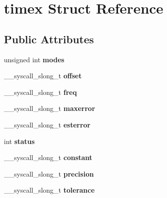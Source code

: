 \hypertarget{structtimex}{\section{timex Struct Reference}
\label{structtimex}
}
\subsection*{Public Attributes}
\begin{DoxyCompactItemize}
\item 
\hypertarget{structtimex_ab8e9ae426d0cf972b8133f1c8af5d7a7}{unsigned int {\bfseries modes}}\label{structtimex_ab8e9ae426d0cf972b8133f1c8af5d7a7}

\item 
\hypertarget{structtimex_a16a573a2edfa22f45ce7055a299abadd}{\+\_\+\+\_\+syscall\+\_\+slong\+\_\+t {\bfseries offset}}\label{structtimex_a16a573a2edfa22f45ce7055a299abadd}

\item 
\hypertarget{structtimex_a804c651db264aff521444997c08943c5}{\+\_\+\+\_\+syscall\+\_\+slong\+\_\+t {\bfseries freq}}\label{structtimex_a804c651db264aff521444997c08943c5}

\item 
\hypertarget{structtimex_a6cb2b8d652aabf89fdd92c28b841a112}{\+\_\+\+\_\+syscall\+\_\+slong\+\_\+t {\bfseries maxerror}}\label{structtimex_a6cb2b8d652aabf89fdd92c28b841a112}

\item 
\hypertarget{structtimex_a0291b846874f45029c67df3f04406c3c}{\+\_\+\+\_\+syscall\+\_\+slong\+\_\+t {\bfseries esterror}}\label{structtimex_a0291b846874f45029c67df3f04406c3c}

\item 
\hypertarget{structtimex_a7cd7a7465c8c01e42fb46e6abb42597b}{int {\bfseries status}}\label{structtimex_a7cd7a7465c8c01e42fb46e6abb42597b}

\item 
\hypertarget{structtimex_abe596d8467473792fde7791b4a02d7fd}{\+\_\+\+\_\+syscall\+\_\+slong\+\_\+t {\bfseries constant}}\label{structtimex_abe596d8467473792fde7791b4a02d7fd}

\item 
\hypertarget{structtimex_a293cedae1dd3a84f8e7fb94af1bba735}{\+\_\+\+\_\+syscall\+\_\+slong\+\_\+t {\bfseries precision}}\label{structtimex_a293cedae1dd3a84f8e7fb94af1bba735}

\item 
\hypertarget{structtimex_a67c46a372f03bd85d57611f9a94b7f9c}{\+\_\+\+\_\+syscall\+\_\+slong\+\_\+t {\bfseries tolerance}}\label{structtimex_a67c46a372f03bd85d57611f9a94b7f9c}


\end{DoxyCompactItemize}
